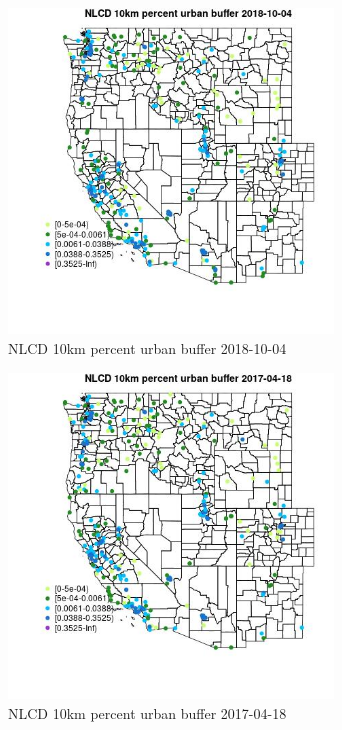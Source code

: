 \begin{figure} 
\centering  
\includegraphics[width=0.77\textwidth]{Code_Outputs/Report_ML_input_PM25_Step4_part_f_de_duplicated_aves_prioritize_24hr_obswNAs_MapObsNLCD_10km_percent_urban_buffer2018-10-04.jpg} 
\caption{\label{fig:Report_ML_input_PM25_Step4_part_f_de_duplicated_aves_prioritize_24hr_obswNAsMapObsNLCD_10km_percent_urban_buffer2018-10-04}NLCD 10km percent urban buffer 2018-10-04} 
\end{figure} 
 

\begin{figure} 
\centering  
\includegraphics[width=0.77\textwidth]{Code_Outputs/Report_ML_input_PM25_Step4_part_f_de_duplicated_aves_prioritize_24hr_obswNAs_MapObsNLCD_10km_percent_urban_buffer2017-04-18.jpg} 
\caption{\label{fig:Report_ML_input_PM25_Step4_part_f_de_duplicated_aves_prioritize_24hr_obswNAsMapObsNLCD_10km_percent_urban_buffer2017-04-18}NLCD 10km percent urban buffer 2017-04-18} 
\end{figure} 
 

